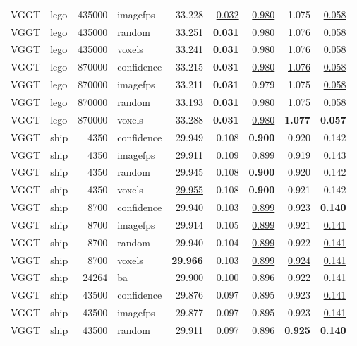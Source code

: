 \begin{table}[H]
\begin{tabular}{llrlrrrrr}
VGGT & lego & 435000 & imagefps & 33.228 & \underline{0.032} & \underline{0.980} & 1.075 & \underline{0.058} \\
VGGT & lego & 435000 & random & 33.251 & \textbf{0.031} & \underline{0.980} & \underline{1.076} & \underline{0.058} \\
VGGT & lego & 435000 & voxels & 33.241 & \textbf{0.031} & \underline{0.980} & \underline{1.076} & \underline{0.058} \\
VGGT & lego & 870000 & confidence & 33.215 & \textbf{0.031} & \underline{0.980} & \underline{1.076} & \underline{0.058} \\
VGGT & lego & 870000 & imagefps & 33.211 & \textbf{0.031} & 0.979 & 1.075 & \underline{0.058} \\
VGGT & lego & 870000 & random & 33.193 & \textbf{0.031} & \underline{0.980} & 1.075 & \underline{0.058} \\
VGGT & lego & 870000 & voxels & 33.288 & \textbf{0.031} & \underline{0.980} & \textbf{1.077} & \textbf{0.057} \\
\midrule
VGGT & ship & 4350 & confidence & 29.949 & 0.108 & \textbf{0.900} & 0.920 & 0.142 \\
VGGT & ship & 4350 & imagefps & 29.911 & 0.109 & \underline{0.899} & 0.919 & 0.143 \\
VGGT & ship & 4350 & random & 29.945 & 0.108 & \textbf{0.900} & 0.920 & 0.142 \\
VGGT & ship & 4350 & voxels & \underline{29.955} & 0.108 & \textbf{0.900} & 0.921 & 0.142 \\
VGGT & ship & 8700 & confidence & 29.940 & 0.103 & \underline{0.899} & 0.923 & \textbf{0.140} \\
VGGT & ship & 8700 & imagefps & 29.914 & 0.105 & \underline{0.899} & 0.921 & \underline{0.141} \\
VGGT & ship & 8700 & random & 29.940 & 0.104 & \underline{0.899} & 0.922 & \underline{0.141} \\
VGGT & ship & 8700 & voxels & \textbf{29.966} & 0.103 & \underline{0.899} & \underline{0.924} & \underline{0.141} \\
VGGT & ship & 24264 & ba & 29.900 & 0.100 & 0.896 & 0.922 & \underline{0.141} \\
VGGT & ship & 43500 & confidence & 29.876 & 0.097 & 0.895 & 0.923 & \underline{0.141} \\
VGGT & ship & 43500 & imagefps & 29.877 & 0.097 & 0.895 & 0.923 & \underline{0.141} \\
VGGT & ship & 43500 & random & 29.911 & 0.097 & 0.896 & \textbf{0.925} & \textbf{0.140} \\

\end{tabular}
\end{table}
